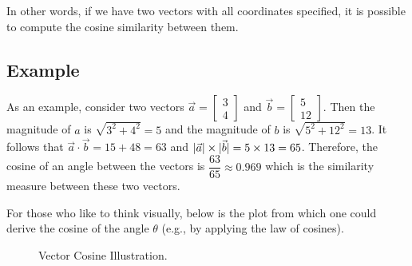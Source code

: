 \documentclass[11pt]{article}
\DeclarePairedDelimiter\abs{\lvert}{\rvert}
\begin{document}
In other words, if we have two vectors with all coordinates specified, it is
possible to compute the cosine similarity between them.

\subsection{Example}

As an example, consider two vectors
\(\vec{a} = \begin{bmatrix}3 \\ 4\end{bmatrix}\)
and \(\vec{b} = \begin{bmatrix}5 \\ 12\end{bmatrix}\).
Then the magnitude of \(a\) is \(\sqrt{3^2 + 4^2} = 5\) and the magnitude of
\(b\) is \(\sqrt{5^2 + 12^2} = 13\). It follows that
\(\vec{a} \cdot \vec{b} = 15 + 48 = 63\) and
\(\abs{\vec{a}} \times \abs{\vec{b}} = 5 \times 13 = 65\). Therefore, the
cosine of an angle between the vectors is \(\dfrac{63}{65} \approx 0.969\)
which is the similarity measure between these two vectors.

\bigskip

For those who like to think visually, below is the plot from which one could
derive the cosine of the angle $\theta$ (e.g., by applying the law of cosines).

\begin{figure}[H]
  \begin{center}
  \end{center}
  \caption{Vector Cosine Illustration.}
\end{figure}
\end{document}
